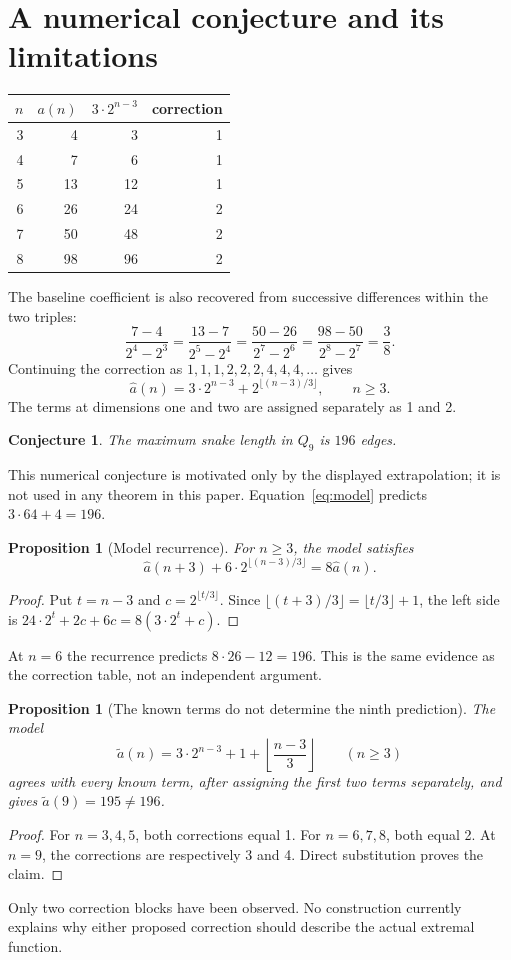 \documentclass[11pt,a4paper]{article}
\newtheorem{proposition}[theorem]{Proposition}
\newtheorem{conjecture}[theorem]{Conjecture}
\theoremstyle{definition}
\theoremstyle{remark}
\newcommand{\Q}{Q}
\begin{document}
\section{A numerical conjecture and its limitations}\label{sec:hypothesis}
\begin{center}
\begin{tabular}{rrrr}
\toprule
$n$ & $a(n)$ & $3\cdot2^{n-3}$ & correction\\
\midrule
3&4&3&1\\4&7&6&1\\5&13&12&1\\
6&26&24&2\\7&50&48&2\\8&98&96&2\\
\bottomrule
\end{tabular}
\end{center}
The baseline coefficient is also recovered from successive differences within the two triples:
\[
\frac{7-4}{2^4-2^3}=\frac{13-7}{2^5-2^4}
=\frac{50-26}{2^7-2^6}=\frac{98-50}{2^8-2^7}=\frac38.
\]
Continuing the correction as $1,1,1,2,2,2,4,4,4,\ldots$ gives
\begin{equation}\label{eq:model}
\widehat a(n)=3\cdot2^{n-3}+2^{\lfloor(n-3)/3\rfloor},\qquad n\ge3.
\end{equation}
The terms at dimensions one and two are assigned separately as 1 and 2.

\begin{conjecture}\label{conj:196}
The maximum snake length in $\Q_9$ is $196$ edges.
\end{conjecture}
This numerical conjecture is motivated only by the displayed extrapolation; it is not used in any theorem in this paper. Equation~\eqref{eq:model} predicts $3\cdot64+4=196$.

\begin{proposition}[Model recurrence]
For $n\ge3$, the model satisfies
\[
\widehat a(n+3)+6\cdot2^{\lfloor(n-3)/3\rfloor}=8\widehat a(n).
\]
\end{proposition}
\begin{proof}
Put $t=n-3$ and $c=2^{\lfloor t/3\rfloor}$. Since $\lfloor(t+3)/3\rfloor=\lfloor t/3\rfloor+1$, the left side is
$24\cdot2^t+2c+6c=8(3\cdot2^t+c)$.
\end{proof}
At $n=6$ the recurrence predicts $8\cdot26-12=196$. This is the same evidence as the correction table, not an independent argument.

\begin{proposition}[The known terms do not determine the ninth prediction]
The model
\[
\widetilde a(n)=3\cdot2^{n-3}+1+\left\lfloor\frac{n-3}{3}\right\rfloor
\qquad(n\ge3)
\]
agrees with every known term, after assigning the first two terms separately, and gives $\widetilde a(9)=195\ne196$.
\end{proposition}
\begin{proof}
For $n=3,4,5$, both corrections equal 1. For $n=6,7,8$, both equal 2. At $n=9$, the corrections are respectively 3 and 4. Direct substitution proves the claim.
\end{proof}
Only two correction blocks have been observed. No construction currently explains why either proposed correction should describe the actual extremal function.
\end{document}
